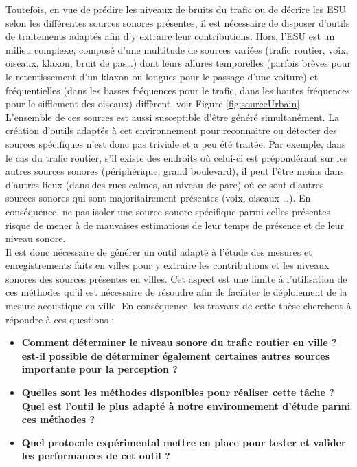 Toutefois, en vue de prédire les niveaux de bruits du trafic ou de décrire les ESU selon les différentes sources sonores présentes, il est nécessaire de disposer d'outils de traitements  adaptés afin d'y extraire leur contributions. Hors, l'ESU est un milieu complexe, composé d'une multitude de sources variées (trafic routier, voix, oiseaux, klaxon, bruit de pas\dots) dont leurs allures temporelles (parfois brèves pour le retentissement d'un klaxon ou longues pour le passage d'une voiture) et fréquentielles (dans les basses fréquences pour le trafic, dans les hautes fréquences pour le sifflement des oiseaux) diffèrent, voir Figure \ref{fig:sourceUrbain}.
L'ensemble de ces sources est aussi susceptible d'être généré simultanément. La création d'outils adaptés à cet environnement pour reconnaitre ou détecter des sources spécifiques n'est donc pas triviale et a peu été traitée. Par exemple, dans le cas du trafic routier, s'il existe des endroits où celui-ci est prépondérant sur les autres sources sonores (périphérique, grand boulevard), il peut l'être moins dans d'autres lieux (dans des rues calmes, au niveau de parc) où ce sont d'autres sources sonores qui sont majoritairement présentes (voix, oiseaux \dots). En conséquence, ne pas isoler une source sonore spécifique parmi celles présentes risque de mener à de mauvaises estimations de leur temps de présence et de leur niveau sonore. \\

Il est donc nécessaire de générer un outil adapté à l'étude des mesures et enregistrements faits en villes pour y extraire les contributions et les niveaux sonores des sources présentes en villes. Cet aspect est une limite à l'utilisation de ces méthodes qu'il est nécessaire de résoudre afin de faciliter le déploiement de la mesure acoustique en ville.
En conséquence, les travaux de cette thèse cherchent à répondre à ces questions :

\begin{itemize}
\item \textbf{Comment déterminer le niveau sonore du trafic routier en ville ? est-il possible de déterminer également certaines autres sources importante pour la perception ?}
\item \textbf{Quelles sont les méthodes disponibles pour réaliser cette tâche ? Quel est l'outil le plus adapté à notre  environnement d'étude parmi ces méthodes ?}
\item \textbf{Quel protocole expérimental mettre en place pour tester et valider les performances de cet outil ?}
\end{itemize}

